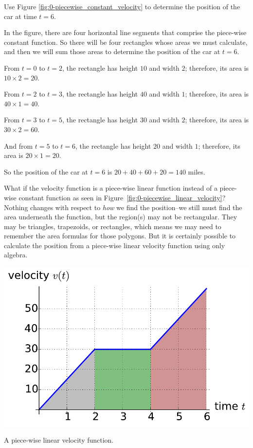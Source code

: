 \begin{example} %
Use Figure \ref{fig:0-piecewise_constant_velocity} to determine the position of the car at time $t=6$.

\solution In the figure, there are four horizontal line segments that comprise the piece-wise constant function.  So there will be four rectangles whose areas we must calculate, and then we will sum those areas to determine the position of the car at $t=6$.

From $t = 0$ to $t = 2$, the rectangle has height $10$ and width $2$; therefore, its area is $10 \times 2 = 20$.

From $t = 2$ to $t = 3$, the rectangle has height $40$ and width $1$; therefore, its area is $40 \times 1 = 40$.

From $t = 3$ to $t = 5$, the rectangle has height $30$ and width $2$; therefore, its area is $30 \times 2 = 60$.

And from $t = 5$ to $t = 6$, the rectangle has height $20$ and width $1$; therefore, its area is $20 \times 1 = 20$.

So the position of the car at $t = 6$ is $20 + 40 + 60 + 20 = 140$ miles.
\end{example}

What if the velocity function is a piece-wise linear function instead of a piece-wise constant function as seen in Figure~\ref{fig:0-piecewise_linear_velocity}?  Nothing changes with respect to {\em how} we find the position--we still must find the area underneath the function, but the region(s) may not be rectangular.  They may be triangles, trapezoids, or rectangles, which means we may need to remember the area formulas for those polygons.  But it is certainly possible to calculate the position from a piece-wise linear velocity function using only algebra.

\begin{marginfigure} %
\includegraphics[width=\marginparwidth]{figs/0/piecewise_linear_velocity.pdf}
\caption{A piece-wise linear velocity function.}
\label{fig:0-piecewise_linear_velocity}
\end{marginfigure}

